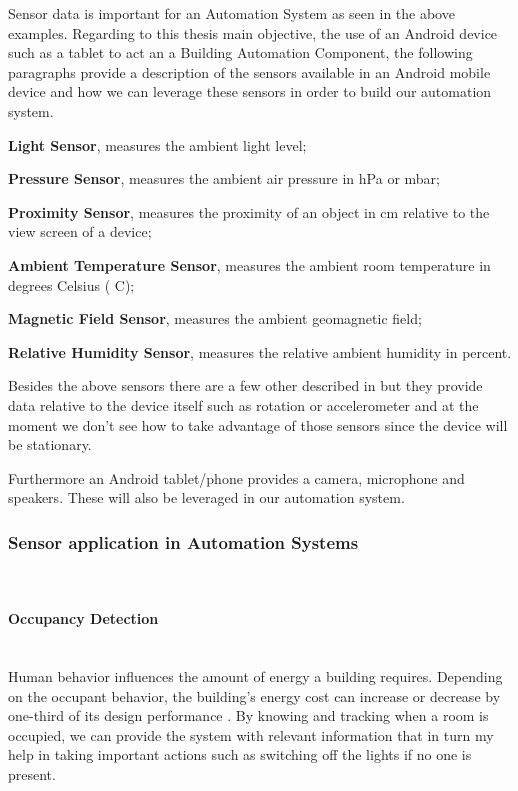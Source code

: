 Sensor data is important for an Automation System as seen in the above examples. Regarding to this thesis main objective, the use of an Android device such as a tablet to act an a Building Automation Component, the following paragraphs provide a description of the sensors available in an Android mobile device \cite{android:sensors} and how we can leverage these sensors in order to build our automation system.

\textbf{Light Sensor}, measures the ambient light level;

\textbf{Pressure Sensor}, measures the ambient air pressure in hPa or mbar;

\textbf{Proximity Sensor}, measures the proximity of an object in cm relative to the view screen of a device;

\textbf{Ambient Temperature Sensor}, measures the ambient room temperature in degrees Celsius ( C);

\textbf{Magnetic Field Sensor}, measures the ambient geomagnetic field;

\textbf{Relative Humidity Sensor}, measures the relative ambient humidity in percent.

Besides the above sensors there are a few other described in \cite{android:sensors} but they provide data relative to the device itself such as rotation or accelerometer and at the moment we don't see how to take advantage of those sensors since the device will be stationary.

Furthermore an Android tablet/phone provides a camera, microphone and speakers. These will also be leveraged in our automation system.



\subsubsection{Sensor application in Automation Systems}\mbox{}\\

\paragraph{Occupancy Detection}\label{ocupacy_detection}\mbox{}\\

Human behavior influences the amount of energy a building requires. Depending on the occupant behavior, the building's energy cost can increase or decrease by one-third of its design performance \cite{ocupancy2}. 
By knowing and tracking when a room is occupied, we can provide the system with relevant information that in turn my help in taking important actions such as switching off the lights if no one is present. 

